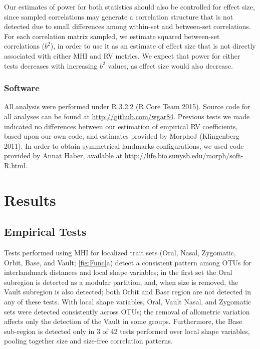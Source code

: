 \documentclass[12pt,]{article}
\begin{document}
Our estimates of power for both statistics should also be controlled for
effect size, since sampled correlations may generate a correlation
structure that is not detected due to small differences among within-set
and between-set correlations. For each correlation matrix sampled, we
estimate squared between-set correlations ($b^2$), in order to use it as
an estimate of effect size that is not directly associated with either
MHI and RV metrics. We expect that power for either tests decreases with
increasing $b^2$ values, as effect size would also decrease.

\subsubsection{Software}\label{software}

All analysis were performed under R 3.2.2 (R Core Team 2015). Source
code for all analyses can be found at \url{http://github.com/wgar84}.
Previous tests we made indicated no differences between our estimation
of empirical RV coefficients, based upon our own code, and estimates
provided by MorphoJ (Klingenberg 2011). In order to obtain symmetrical
landmarks configurations, we used code provided by Annat Haber,
available at \url{http://life.bio.sunysb.edu/morph/soft-R.html}.

\section{Results}\label{results}

\subsection{Empirical Tests}\label{empirical-tests-1}

Tests performed using MHI for localized trait sets (Oral, Nasal,
Zygomatic, Orbit, Base, and Vault; \autoref{fig:Func}a) detect a
consistent pattern among OTUs for interlandmark distances and local
shape variables; in the first set the Oral subregion is detected as a
modular partition, and, when size is removed, the Vault subregion is
also detected; both Orbit and Base region are not detected in any of
these tests. With local shape variables, Oral, Vault Nasal, and
Zygomatic sets were detected consistently across OTUs; the removal of
allometric variation affects only the detection of the Vault in some
groups. Furthermore, the Base sub-region is detected only in 3 of 42
tests performed over local shape variables, pooling together size and
size-free correlation patterns.
\end{document}

